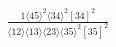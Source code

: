 \documentclass[varwidth, border=5pt]{standalone}
\begin{document}
\begin{my}
$\begin{gathered}
\scriptscriptstyle\frac{1⟨45⟩^2⟨34⟩^2[34]^2}{⟨12⟩⟨13⟩⟨23⟩⟨35⟩^2[35]^2}
\end{gathered}$
\end{my}
\end{document}
